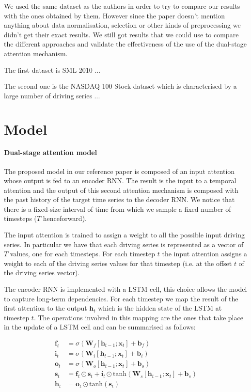 \documentclass{article}
\begin{document}
We used the same dataset as the authors in order to try to compare our results with the ones obtained by them. However
since the paper doesn't mention anything about data normalisation, selection or other kinds of preprocessing we didn't 
get their exact results. We still got results that we could use to compare the different approaches and validate the 
effectiveness of the use of the dual-stage attention mechanism.

The first dataset is SML 2010 ...

The second one is the NASDAQ 100 Stock dataset which is characterised by a large number of driving series ...


\section{Model}
\label{sec:model}

\paragraph{Dual-stage attention model}

The proposed model in our reference paper is composed of an input attention whose output is fed to an encoder RNN. The 
result is the input to a temporal attention and the output of this second attention mechanism is composed with the 
past history of the target time series to the decoder RNN. We notice that there is a fixed-size interval of time from
which we sample a fixed number of timesteps ($T$ henceforward).

The input attention is trained to assign a weight to all the possible input driving series. In particular we have 
that each driving series is represented as a vector of $T$ values, one for each timesteps. For each timestep $t$ the 
input attention assigns a weight to each of the driving series values for that timestep (i.e. at the offset $t$ of the
driving series vector).

The encoder RNN is implemented with a LSTM cell, this choice allows the model to capture long-term dependencies. 
For each timestep we map the result of the first attention to the output $\mathbf{h}_t$ which is the hidden state of 
the LSTM at timestep $t$. The operations involved in this mapping are the ones that take place in the update of a LSTM
cell and can be summarised as follows:


\begin{equation} \label{eq:lstm}
\begin{split}
\mathbf{f}_t &= \sigma (\mathbf{W}_f[\mathbf{h}_{t-1};\mathbf{x}_t] + \mathbf{b}_f) \\
\mathbf{i}_t &= \sigma (\mathbf{W}_i[\mathbf{h}_{t-1};\mathbf{x}_t] + \mathbf{b}_i) \\
\mathbf{o}_t &= \sigma (\mathbf{W}_o[\mathbf{h}_{t-1};\mathbf{x}_t] + \mathbf{b}_o) \\
\mathbf{s}_t &= \mathbf{f}_t \odot \mathbf{s}_t + \mathbf{i}_t 
				\odot \text{tanh}(\mathbf{W}_s[\mathbf{h}_{t-1};\mathbf{x}_t] + \mathbf{b}_s) \\
\mathbf{h}_t &= \mathbf{o}_t \odot \text{tanh}(\mathbf{s}_t)
\end{split}
\end{equation}
\end{document}
